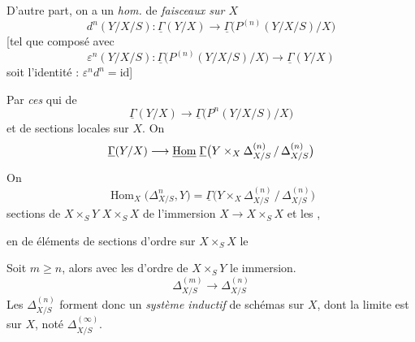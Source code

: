 \documentclass[11pt,a4paper]{article}
\begin{document}


D'autre part, on a \ill{} \ill{} un \emph{hom.}  de
\emph{faisceaux sur $X$}
\[
  d^{n}(Y/X/S) : \underline{\Gamma}(Y/X) \longrightarrow
  \underline{\Gamma}\bigl(P^{(n)}(Y/X/S)/X\bigr)
\]
[tel que \ill{} composé avec
\[
  \varepsilon^{n}(Y/X/S) : \underline{\Gamma}\bigl(P^{(n)}(Y/X/S)/X\bigr)
  \longrightarrow \underline{\Gamma}(Y/X)
\]
soit l'identité : $\varepsilon^{n} d^{n} = \mathrm{id}$]

 Par \emph{ces} \ill{} \struck{\ill{}} qui
 \ill{} de 
\[
  \underline{\Gamma}(Y/X) \longrightarrow
  \underline{\Gamma}\bigl(P^{n}(Y/X/S)/X\bigr)
\]
et de  \ill{} \ill{} sections locales sur $X$. On
 
\[
  \underline{\Gamma}(Y/X) \longrightarrow \struck{\operatorname{Hom}}\;
  \underline{\Gamma}\bigl(Y \times_{X} \Delta^{(n)}_{X/S} \,/\,
  \Delta^{(n)}_{X/S}\bigr)
\]
On
\[
  \operatorname{Hom}_{X}\bigl(\Delta^{n}_{X/S}, Y\bigr) =
  \underline{\Gamma}\bigl(Y \times_{X} \Delta^{(n)}_{X/S} \,/\,
  \Delta^{(n)}_{X/S}\bigr)
\]
\ill{} sections  de $X \times_{S} Y$ \ill{}
$X \times_{S} X$ \ill{} de l'immersion $X \longrightarrow X \times_{S} X$
et les , \ill{} \ill{}


\ill{} en \ill{} \ill{} de éléments de sections d'ordre \ill{} sur
$X \times_{S} X$ le \ill{}

Soit $m \geq n$, alors \ill{}  avec les \ill{}
d'ordre \ill{} de $X \times_{S} Y$ \ill{} le \ill{} immersion.
\[
  \Delta^{(m)}_{X/S} \longrightarrow \Delta^{(n)}_{X/S}
\]
Les $\Delta^{(n)}_{X/S}$ forment donc un \emph{système inductif} de schémas
sur $X$, dont la limite est \ill{} \ill{} sur $X$, noté
$\Delta^{(\infty)}_{X/S}$.
\end{document}
